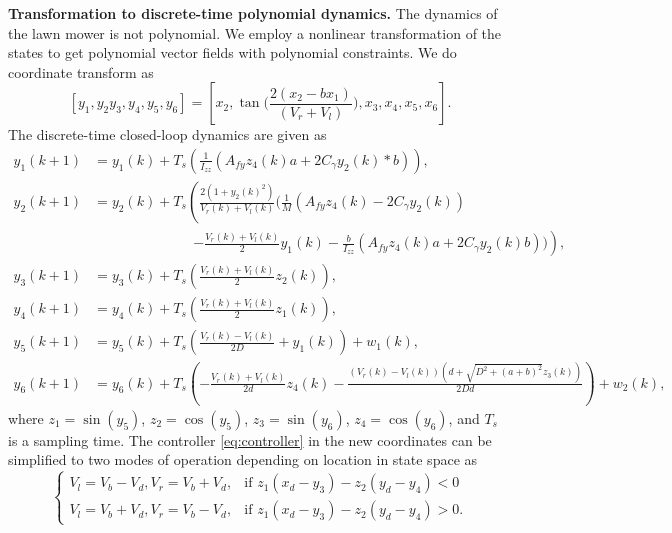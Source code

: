 \documentclass[EPiC]{easychair}
\begin{document}
\noindent
\textbf{Transformation to discrete-time polynomial dynamics.}
The dynamics of the lawn mower is not polynomial. We employ a nonlinear transformation of the states to get polynomial vector fields with polynomial constraints.
%
We do coordinate transform as
$$[y_1,y_2 y_3,y_4,y_5,y_6]=[x_2,\tan\Big(  \frac{2(x_2-bx_1)}{(V_r+V_l)}\Big ),x_3,x_4,x_5,x_6].$$
%
%
The discrete-time closed-loop dynamics are given as 
\begin{align*}
y_1(k+1) &=y_1(k)+T_s\left(\frac{1}{I_{zz}}(A_{fy} z_4(k) a+2C_{\gamma} y_2(k)*b)\right),\\
y_2(k+1) &=y_2(k)+T_s\left(\frac{2(1+y_2(k)^2)}{V_r(k)+V_l(k)}\Big(\frac{1}{M}(A_{fy}z_4(k)-2C_{\gamma}y_2(k))\right.\\
&\hspace{3cm}\left.-\frac{V_r(k)+V_l(k)}{2}y_1(k)-\frac{b}{I_{zz}}(A_{fy} z_4(k) a+2C_{\gamma} y_2(k)b)\Big)\right),\\
y_3(k+1) &=y_3(k)+T_s\left(\frac{V_r(k)+V_l(k)}{2}z_2(k)\right),\\
y_4(k+1) &=y_4(k)+T_s\left(\frac{V_r(k)+V_l(k)}{2}z_1(k)\right),\\
y_5(k+1) &=y_5(k)+T_s\left(\frac{V_r(k)-V_l(k)}{2D}+y_1(k)\right)+w_1(k),\\
y_6(k+1) &=y_6(k)+T_s\left(-\frac{V_r(k)+V_l(k)}{2d}z_4(k)-\frac{(V_r(k)-V_l(k))(d+\sqrt{D^2+(a+b)^2} z_3(k))}{2Dd}\right)+w_2(k),
\end{align*}
where $z_1=\sin(y_5)$, $z_2=\cos(y_5)$, $z_3=\sin(y_6)$, $z_4=\cos(y_6)$, and $T_s$ is a sampling time.
The controller \eqref{eq:controller} in the new coordinates can be simplified to
two modes of operation depending on location in state space as
\begin{equation*}
\begin{cases}
V_l=V_b-V_d, V_r=V_b+V_d , & \text{if }z_1(x_d-y_3)-z_2(y_d-y_4)<0\\
V_l=V_b+V_d, V_r=V_b-V_d , & \text{if }z_1(x_d-y_3)-z_2(y_d-y_4)>0.
\end{cases}
\end{equation*}
\end{document}

